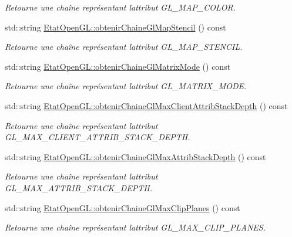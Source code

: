 \begin{DoxyCompactItemize}
\begin{DoxyCompactList}\small\item\em Retourne une chaîne représentant l\textquotesingle{}attribut G\+L\+\_\+\+M\+A\+P\+\_\+\+C\+O\+L\+O\+R. \end{DoxyCompactList}\item 
std\+::string \hyperlink{group__utilitaire_ga17a6e4887be554b1845d8eb595129b0c}{Etat\+Open\+G\+L\+::obtenir\+Chaine\+Gl\+Map\+Stencil} () const 
\begin{DoxyCompactList}\small\item\em Retourne une chaîne représentant l\textquotesingle{}attribut G\+L\+\_\+\+M\+A\+P\+\_\+\+S\+T\+E\+N\+C\+I\+L. \end{DoxyCompactList}\item 
std\+::string \hyperlink{group__utilitaire_ga3cb5f2ef622bebc2786449eda2460d55}{Etat\+Open\+G\+L\+::obtenir\+Chaine\+Gl\+Matrix\+Mode} () const 
\begin{DoxyCompactList}\small\item\em Retourne une chaîne représentant l\textquotesingle{}attribut G\+L\+\_\+\+M\+A\+T\+R\+I\+X\+\_\+\+M\+O\+D\+E. \end{DoxyCompactList}\item 
std\+::string \hyperlink{group__utilitaire_ga2085416ccd06cb60bc98ba2207174dd1}{Etat\+Open\+G\+L\+::obtenir\+Chaine\+Gl\+Max\+Client\+Attrib\+Stack\+Depth} () const 
\begin{DoxyCompactList}\small\item\em Retourne une chaîne représentant l\textquotesingle{}attribut G\+L\+\_\+\+M\+A\+X\+\_\+\+C\+L\+I\+E\+N\+T\+\_\+\+A\+T\+T\+R\+I\+B\+\_\+\+S\+T\+A\+C\+K\+\_\+\+D\+E\+P\+T\+H. \end{DoxyCompactList}\item 
std\+::string \hyperlink{group__utilitaire_gaa03eca9a37a755a11183714292f89779}{Etat\+Open\+G\+L\+::obtenir\+Chaine\+Gl\+Max\+Attrib\+Stack\+Depth} () const 
\begin{DoxyCompactList}\small\item\em Retourne une chaîne représentant l\textquotesingle{}attribut G\+L\+\_\+\+M\+A\+X\+\_\+\+A\+T\+T\+R\+I\+B\+\_\+\+S\+T\+A\+C\+K\+\_\+\+D\+E\+P\+T\+H. \end{DoxyCompactList}\item 
std\+::string \hyperlink{group__utilitaire_gae90d5285df064d711bedd09091ba413b}{Etat\+Open\+G\+L\+::obtenir\+Chaine\+Gl\+Max\+Clip\+Planes} () const 
\begin{DoxyCompactList}\small\item\em Retourne une chaîne représentant l\textquotesingle{}attribut G\+L\+\_\+\+M\+A\+X\+\_\+\+C\+L\+I\+P\+\_\+\+P\+L\+A\+N\+E\+S. \end{DoxyCompactList}\item 

\end{DoxyCompactItemize}
